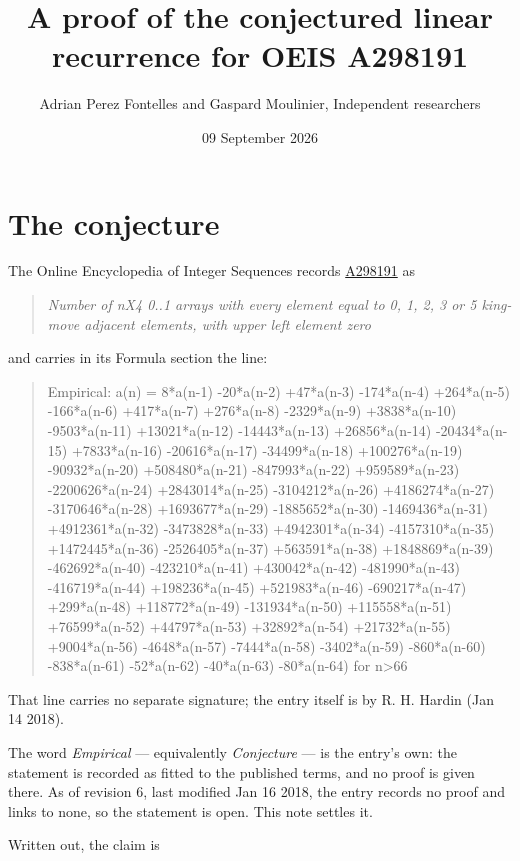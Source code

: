 \documentclass[11pt]{article}
\title{A proof of the conjectured linear recurrence for OEIS A298191}
\author{Adrian Perez Fontelles and Gaspard Moulinier, Independent researchers}
\date{09 September 2026}
\theoremstyle{definition}
\begin{document}
\maketitle
\section{The conjecture}

The Online Encyclopedia of Integer Sequences records \href{https://oeis.org/A298191}{A298191} as

\begin{quote}\itshape Number of nX4 0..1 arrays with every element equal to 0, 1, 2, 3 or 5 king-move adjacent elements, with upper left element zero\end{quote}

and carries in its Formula section the line:

\begin{quote}\ttfamily Empirical: a(n) = 8*a(n-1) -20*a(n-2) +47*a(n-3) -174*a(n-4) +264*a(n-5) -166*a(n-6) +417*a(n-7) +276*a(n-8) -2329*a(n-9) +3838*a(n-10) -9503*a(n-11) +13021*a(n-12) -14443*a(n-13) +26856*a(n-14) -20434*a(n-15) +7833*a(n-16) -20616*a(n-17) -34499*a(n-18) +100276*a(n-19) -90932*a(n-20) +508480*a(n-21) -847993*a(n-22) +959589*a(n-23) -2200626*a(n-24) +2843014*a(n-25) -3104212*a(n-26) +4186274*a(n-27) -3170646*a(n-28) +1693677*a(n-29) -1885652*a(n-30) -1469436*a(n-31) +4912361*a(n-32) -3473828*a(n-33) +4942301*a(n-34) -4157310*a(n-35) +1472445*a(n-36) -2526405*a(n-37) +563591*a(n-38) +1848869*a(n-39) -462692*a(n-40) -423210*a(n-41) +430042*a(n-42) -481990*a(n-43) -416719*a(n-44) +198236*a(n-45) +521983*a(n-46) -690217*a(n-47) +299*a(n-48) +118772*a(n-49) -131934*a(n-50) +115558*a(n-51) +76599*a(n-52) +44797*a(n-53) +32892*a(n-54) +21732*a(n-55) +9004*a(n-56) -4648*a(n-57) -7444*a(n-58) -3402*a(n-59) -860*a(n-60) -838*a(n-61) -52*a(n-62) -40*a(n-63) -80*a(n-64) for n>66\end{quote}

That line carries no separate signature; the entry itself is by R. H. Hardin (Jan 14 2018).

The word {\itshape Empirical} --- equivalently {\itshape Conjecture} --- is the entry's own: the statement is recorded as fitted to the published terms, and no proof is given there. As of revision 6, last modified Jan 16 2018, the entry records no proof and links to none, so the statement is open. This note settles it.

Written out, the claim is
\end{document}
